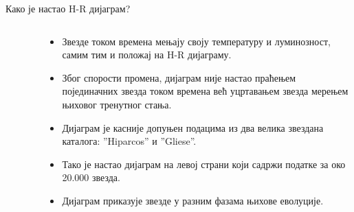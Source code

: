 \documentclass[aspectratio=169, xcolor=table, 10pt]{beamer}
\begin{document}
\begin{frame}{Како је настао H-R дијаграм?}
  \begin{columns}[T]
    \begin{column}{0.4\textwidth}
      \begin{figure}
        \centering
        \vspace{-1em}
      \end{figure}
    \end{column}
    \begin{column}{0.6\textwidth}
      \begin{itemize}
        \item Звезде током времена мењају своју температуру и луминозност, самим тим и положај на H-R дијаграму.
        \item Због спорости промена, дијаграм није настао праћењем појединачних звезда током времена већ уцртавањем звезда мерењем њиховог тренутног стања.
        \item Дијаграм је касније допуњен подацима из два велика звездана каталога: ”Hiparcos” и ”Gliese”.
        \item Тако је настао дијаграм на левој страни који садржи податке за око 20.000 звезда.
        \item Дијаграм приказује звезде у разним фазама њихове еволуције.
      \end{itemize}
    \end{column}
  \end{columns}
\end{frame}
\end{document}
